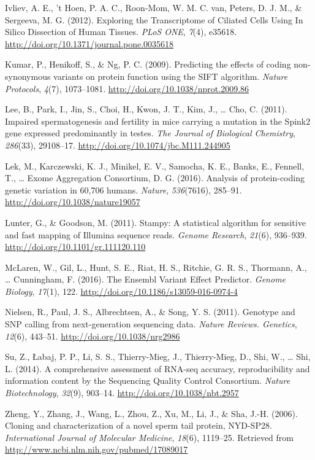 \documentclass[12pt,twoside]{reedthesis}
\theoremstyle{definition}
\theoremstyle{definition}
\theoremstyle{remark}
\begin{document}
  \hypertarget{ref-Ivliev2012}{}
  Ivliev, A. E., 't Hoen, P. A. C., Roon-Mom, W. M. C. van, Peters, D. J.
  M., \& Sergeeva, M. G. (2012). Exploring the Transcriptome of Ciliated
  Cells Using In Silico Dissection of Human Tissues. \emph{PLoS ONE},
  \emph{7}(4), e35618. \url{http://doi.org/10.1371/journal.pone.0035618}
  
  \hypertarget{ref-Kumar2009}{}
  Kumar, P., Henikoff, S., \& Ng, P. C. (2009). Predicting the effects of
  coding non-synonymous variants on protein function using the SIFT
  algorithm. \emph{Nature Protocols}, \emph{4}(7), 1073--1081.
  \url{http://doi.org/10.1038/nprot.2009.86}
  
  \hypertarget{ref-Lee2011}{}
  Lee, B., Park, I., Jin, S., Choi, H., Kwon, J. T., Kim, J., \ldots{}
  Cho, C. (2011). Impaired spermatogenesis and fertility in mice carrying
  a mutation in the Spink2 gene expressed predominantly in testes.
  \emph{The Journal of Biological Chemistry}, \emph{286}(33), 29108--17.
  \url{http://doi.org/10.1074/jbc.M111.244905}
  
  \hypertarget{ref-Lek2016}{}
  Lek, M., Karczewski, K. J., Minikel, E. V., Samocha, K. E., Banks, E.,
  Fennell, T., \ldots{} Exome Aggregation Consortium, D. G. (2016).
  Analysis of protein-coding genetic variation in 60,706 humans.
  \emph{Nature}, \emph{536}(7616), 285--91.
  \url{http://doi.org/10.1038/nature19057}
  
  \hypertarget{ref-Lunter2011}{}
  Lunter, G., \& Goodson, M. (2011). Stampy: A statistical algorithm for
  sensitive and fast mapping of Illumina sequence reads. \emph{Genome
  Research}, \emph{21}(6), 936--939.
  \url{http://doi.org/10.1101/gr.111120.110}
  
  \hypertarget{ref-McLaren2016}{}
  McLaren, W., Gil, L., Hunt, S. E., Riat, H. S., Ritchie, G. R. S.,
  Thormann, A., \ldots{} Cunningham, F. (2016). The Ensembl Variant Effect
  Predictor. \emph{Genome Biology}, \emph{17}(1), 122.
  \url{http://doi.org/10.1186/s13059-016-0974-4}
  
  \hypertarget{ref-Nielsen2011}{}
  Nielsen, R., Paul, J. S., Albrechtsen, A., \& Song, Y. S. (2011).
  Genotype and SNP calling from next-generation sequencing data.
  \emph{Nature Reviews. Genetics}, \emph{12}(6), 443--51.
  \url{http://doi.org/10.1038/nrg2986}
  
  \hypertarget{ref-Su2014}{}
  Su, Z., Łabaj, P. P., Li, S. S., Thierry-Mieg, J., Thierry-Mieg, D.,
  Shi, W., \ldots{} Shi, L. (2014). A comprehensive assessment of RNA-seq
  accuracy, reproducibility and information content by the Sequencing
  Quality Control Consortium. \emph{Nature Biotechnology}, \emph{32}(9),
  903--14. \url{http://doi.org/10.1038/nbt.2957}
  
  \hypertarget{ref-Zheng2006}{}
  Zheng, Y., Zhang, J., Wang, L., Zhou, Z., Xu, M., Li, J., \& Sha, J.-H.
  (2006). Cloning and characterization of a novel sperm tail protein,
  NYD-SP28. \emph{International Journal of Molecular Medicine},
  \emph{18}(6), 1119--25. Retrieved from
  \url{http://www.ncbi.nlm.nih.gov/pubmed/17089017}


\end{document}
